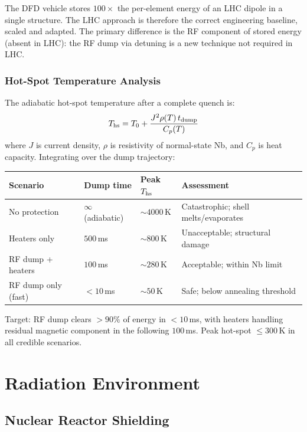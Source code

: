 \documentclass[11pt,a4paper]{article}
\begin{document}
The DFD vehicle stores $100\times$ the per-element energy of an LHC
dipole in a single structure. The LHC approach is therefore the correct
engineering baseline, scaled and adapted. The primary difference is
the RF component of stored energy (absent in LHC): the RF dump via
detuning is a new technique not required in LHC.

\subsubsection{Hot-Spot Temperature Analysis}

The adiabatic hot-spot temperature after a complete quench is:
\begin{equation}
  T_{\rm hs} = T_0 + \frac{J^2 \rho(T) \, t_{\rm dump}}{C_p(T)}
\end{equation}
where $J$ is current density, $\rho$ is resistivity of normal-state Nb,
and $C_p$ is heat capacity. Integrating over the dump trajectory:

\begin{longtable}{p{0.20\tw}p{0.20\tw}p{0.20\tw}p{0.30\tw}}
\toprule
\textbf{Scenario} & \textbf{Dump time} & \textbf{Peak $T_{\rm hs}$} &
\textbf{Assessment} \\
\midrule
\endhead
No protection & $\infty$ (adiabatic) & $\sim 4000$\,K & Catastrophic;
  shell melts/evaporates \\
Heaters only & $500$\,ms & $\sim 800$\,K & Unacceptable;
  structural damage \\
RF dump + heaters & $100$\,ms & $\sim 280$\,K & Acceptable;
  within Nb limit \\
RF dump only (fast) & $< 10$\,ms & $\sim 50$\,K & Safe;
  below annealing threshold \\
\bottomrule
\end{longtable}

Target: RF dump clears $> 90\%$ of energy in $< 10$\,ms, with heaters
handling residual magnetic component in the following $100$\,ms. Peak
hot-spot $\leq 300$\,K in all credible scenarios.

\section{Radiation Environment}
\label{sec:radiation}

\subsection{Nuclear Reactor Shielding}
\end{document}
